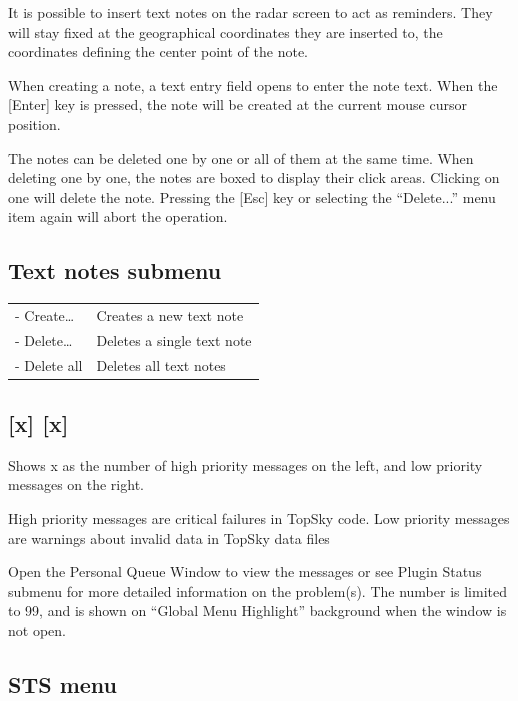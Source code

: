 \documentclass[11pt,a4paper]{memoir}
\begin{document}
It is possible to insert text notes on the radar screen to act as reminders. They will stay fixed at the geographical coordinates they are inserted to, the coordinates defining the center point of the note.

When creating a note, a text entry field opens to enter the note text. When the [Enter] key is pressed, the note will be created at the current mouse cursor position.

The notes can be deleted one by one or all of them at the same time. When deleting one by one, the notes are boxed to display their click areas. Clicking on one will delete the note. Pressing the [Esc] key or selecting the “Delete...” menu item again will abort the operation.

\subsection*{Text notes submenu}
\label{menu:tnm}

\begin{tabular}{l l}
\\- Create…     & Creates a new text note
\\- Delete…     & Deletes a single text note
\\- Delete all  & Deletes all text notes
\end{tabular}

\subsection{[x] [x]}
\label{menu:pqmm}

Shows x as the number of high priority messages on the left, and low priority messages on the right. 

High priority messages are critical failures in TopSky code. Low priority messages are warnings about invalid data in TopSky data files

Open the Personal Queue Window to view the messages or see Plugin Status submenu for more detailed information on the problem(s). The number is limited to 99, and is shown on “Global Menu Highlight” background when the window is not open.
 
\subsection{STS menu}
\label{menu:sts}
\end{document}
